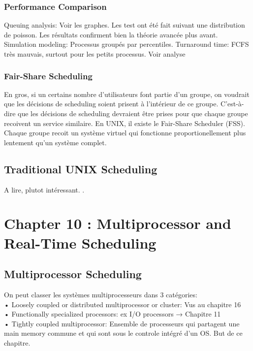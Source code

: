 \subsubsection{Performance Comparison}
Queuing analysis: Voir les graphes.
Les test ont été fait suivant une distribution de poisson.
Les résultats confirment bien la théorie avancée plus avant.
Simulation modeling: Processus groupés par percentiles.
Turnaround time: FCFS très mauvais, surtout pour les petits processus.
Voir analyse \cite[p.~420]{stallings}
\subsubsection{Fair-Share Scheduling}
En gros, si un certains nombre d'utilisateurs font partie d'un groupe, on voudrait que les décisions de scheduling soient prisent à l'intérieur de ce groupe.
C'est-à-dire que les décisions de scheduling devraient être prises pour que chaque groupe recoivent un service similaire.
En UNIX, il existe le Fair-Share Scheduler (FSS).
Chaque groupe recoit un système virtuel qui fonctionne proportionellement plus lentement qu'un système complet.
\subsection{Traditional UNIX Scheduling}
A lire, plutot intéressant.
\cite[p.~423]{stallings}.

\newpage


\section{Chapter 10 : Multiprocessor and Real-Time Scheduling}


\subsection{Multiprocessor Scheduling}
On peut classer les systèmes multiprocesseurs dans 3 catégories: \\
• Loosely coupled or distributed multiprocessor or cluster: Vus au chapitre 16 \\
• Functionally specialized processors: ex I/O processors → Chapitre 11 \\
• Tightly coupled multiprocessor: Ensemble de processeurs qui partagent une main memory commune et qui sont sous le controle intégré d'un OS.
But de ce chapitre.
